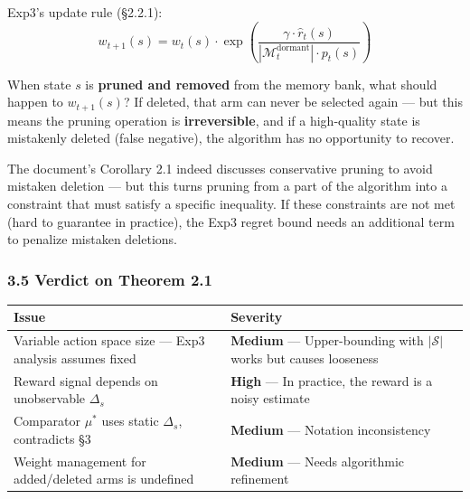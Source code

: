 \documentclass[
  12pt,
]{article}
\begin{document}
Exp3's update rule (\S2.2.1):
\[w_{t+1}(s) = w_t(s) \cdot \exp\left(\frac{\gamma \cdot \hat{r}_t(s)}{|\mathcal{M}_t^{\text{dormant}}| \cdot p_t(s)}\right)\]

When state $s$ is \textbf{pruned and removed} from the memory bank, what should happen to $w_{t+1}(s)$? If deleted, that arm can never be selected again --- but this means the pruning operation is \textbf{irreversible}, and if a high-quality state is mistakenly deleted (false negative), the algorithm has no opportunity to recover.

The document's Corollary 2.1 indeed discusses conservative pruning to avoid mistaken deletion --- but this turns pruning from a part of the algorithm into a constraint that must satisfy a specific inequality. If these constraints are not met (hard to guarantee in practice), the Exp3 regret bound needs an additional term to penalize mistaken deletions.

\subsubsection{3.5 Verdict on Theorem 2.1}\label{verdict-thm-2.1}

\begin{longtable}[]{@{}
  >{\raggedright\arraybackslash}p{}
  >{\raggedright\arraybackslash}p{}@{}}
\toprule\noalign{}
\begin{minipage}[b]{\linewidth}\raggedright
Issue
\end{minipage} & \begin{minipage}[b]{\linewidth}\raggedright
Severity
\end{minipage} \\
\midrule\noalign{}
\endhead
\bottomrule\noalign{}
\endlastfoot
Variable action space size --- Exp3 analysis assumes fixed & \textbf{Medium} --- Upper-bounding with $|\mathcal{S}|$ works but causes looseness \\
Reward signal depends on unobservable $\Delta_s$ & \textbf{High} --- In practice, the reward is a noisy estimate \\
Comparator $\mu^*$ uses static $\Delta_s$, contradicts \S3 & \textbf{Medium} --- Notation inconsistency \\
Weight management for added/deleted arms is undefined & \textbf{Medium} --- Needs algorithmic refinement \\
\end{longtable}
\end{document}
